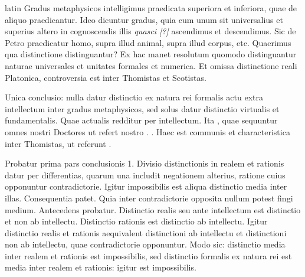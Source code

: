 \begin{otherlanguage*}{latin}
\pstart
Gradus metaphysicos intelligimus praedicata superiora et inferiora, quae de aliquo praedicantur. Ideo dicuntur gradus, quia cum unum sit universalius et superius altero in cognoscendis illis \emph{quasci [?]} ascendimus et descendimus. Sic de Petro praedicatur homo, supra illud animal, supra illud corpus, etc. Quaerimus qua distinctione distinguantur? Ex hac manet resolutum quomodo distinguantur naturae universales et unitates formales et numerica. Et omissa distinctione reali Platonica, controversia est inter Thomistas et Scotistas. 
\pend

\pstart
Unica conclusio:
nulla datur distinctio ex natura rei formalis actu extra intellectum inter gradus metaphysicos, sed solus datur distinctio virtualis et fundamentalis. Quae actualis redditur per intellectum. Ita , quae sequuntur omnes nostri Doctores ut refert nostro . . Haec est communis et characteristica inter Thomistas, ut referunt . 
\pend

\pstart
Probatur prima pars conclusionis 1. Divisio distinctionis in realem et rationis datur per differentias, quarum una includit negationem alterius, ratione cuius opponuntur contradictorie. Igitur impossibilis est aliqua distinctio media inter illas. Consequentia patet. Quia inter contradictorie opposita nullum potest fingi medium. Antecedens probatur. Distinctio realis seu ante intellectum est distinctio et non ab intellectu. Distinctio rationis est distinctio ab intellectu. Igitur distinctio realis et rationis aequivalent distinctioni ab intellectu et distinctioni non ab intellectu, quae contradictorie opponuntur. Modo sic:
distinctio media inter realem et rationis est impossibilis, sed distinctio formalis ex natura rei est media inter realem et rationis:
igitur est impossibilis. 
\pend


\end{otherlanguage*}
